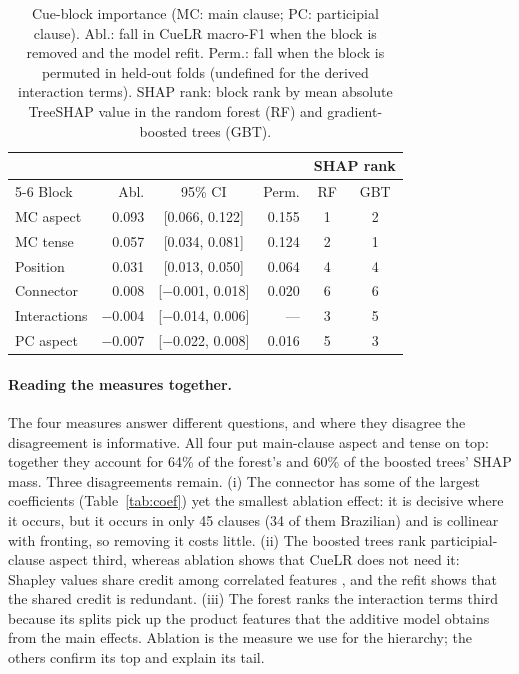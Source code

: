 \documentclass[11pt]{article}
\begin{document}
\begin{table}[t]
\centering\small
\setlength{\tabcolsep}{2.5pt}
\begin{tabular}{lrcrcc}
\toprule
 & & & & \multicolumn{2}{c}{SHAP rank} \\
\cmidrule(lr){5-6}
Block & Abl. & 95\% CI & Perm. & RF & GBT \\
\midrule
MC aspect & 0.093 & [0.066, 0.122] & 0.155 & 1 & 2 \\
MC tense & 0.057 & [0.034, 0.081] & 0.124 & 2 & 1 \\
Position & 0.031 & [0.013, 0.050] & 0.064 & 4 & 4 \\
Connector & 0.008 & [$-$0.001, 0.018] & 0.020 & 6 & 6 \\
Interactions & $-$0.004 & [$-$0.014, 0.006] & --- & 3 & 5 \\
PC aspect & $-$0.007 & [$-$0.022, 0.008] & 0.016 & 5 & 3 \\
\bottomrule
\end{tabular}
\caption{Cue-block importance (MC: main clause; PC: participial clause). Abl.: fall in CueLR macro-F1 when the block is removed and the model refit. Perm.: fall when the block is permuted in held-out folds (undefined for the derived interaction terms). SHAP rank: block rank by mean absolute TreeSHAP value in the random forest (RF) and gradient-boosted trees (GBT).}
\label{tab:hierarchy}
\end{table}

\paragraph{Reading the measures together.} The four measures answer different questions, and where they disagree the disagreement is informative. All four put main-clause aspect and tense on top: together they account for 64\% of the forest's and 60\% of the boosted trees' SHAP mass. Three disagreements remain. (i) The connector has some of the largest coefficients (Table~\ref{tab:coef}) yet the smallest ablation effect: it is decisive where it occurs, but it occurs in only 45 clauses (34 of them Brazilian) and is collinear with fronting, so removing it costs little. (ii) The boosted trees rank participial-clause aspect third, whereas ablation shows that CueLR does not need it: Shapley values share credit among correlated features \citep{aas2021}, and the refit shows that the shared credit is redundant. (iii) The forest ranks the interaction terms third because its splits pick up the product features that the additive model obtains from the main effects. Ablation is the measure we use for the hierarchy; the others confirm its top and explain its tail.
\end{document}
